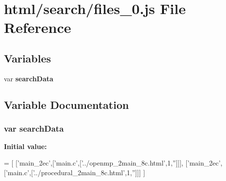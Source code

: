 \section{html/search/files\+\_\+0.js File Reference}
\label{files__0_8js}
\subsection*{Variables}
\begin{DoxyCompactItemize}
\item 
var {\bf search\+Data}
\end{DoxyCompactItemize}


\subsection{Variable Documentation}
\subsubsection[{search\+Data}]{\setlength{\rightskip}{0pt plus 5cm}var search\+Data}\label{files__0_8js_ad01a7523f103d6242ef9b0451861231e}
{\bfseries Initial value\+:}
\begin{DoxyCode}
=
[
  [\textcolor{stringliteral}{'main\_2ec'},[\textcolor{stringliteral}{'main.c'},[\textcolor{stringliteral}{'../openmp\_2main\_8c.html'},1,\textcolor{stringliteral}{''}]]],
  [\textcolor{stringliteral}{'main\_2ec'},[\textcolor{stringliteral}{'main.c'},[\textcolor{stringliteral}{'../procedural\_2main\_8c.html'},1,\textcolor{stringliteral}{''}]]]
]
\end{DoxyCode}
